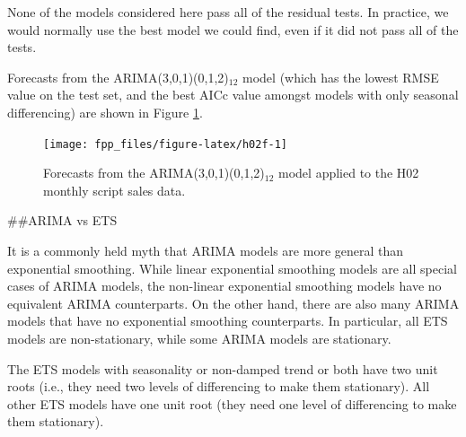 \documentclass[]{book}
\newenvironment{Shaded}{\begin{snugshade}}{\end{snugshade}}
\newcommand{\DataTypeTok}[1]{\textcolor[rgb]{0.13,0.29,0.53}{#1}}
\newcommand{\DecValTok}[1]{\textcolor[rgb]{0.00,0.00,0.81}{#1}}
\newcommand{\KeywordTok}[1]{\textcolor[rgb]{0.13,0.29,0.53}{\textbf{#1}}}
\newcommand{\NormalTok}[1]{#1}
\newcommand{\OperatorTok}[1]{\textcolor[rgb]{0.81,0.36,0.00}{\textbf{#1}}}
\newcommand{\StringTok}[1]{\textcolor[rgb]{0.31,0.60,0.02}{#1}}
\begin{document}
None of the models considered here pass all of the residual tests. In practice, we would normally use the best model we could find, even if it did not pass all of the tests.

Forecasts from the ARIMA(3,0,1)(0,1,2)\(_{12}\) model (which has the lowest RMSE value on the test set, and the best AICc value amongst models with only seasonal differencing) are shown in Figure \ref{fig:h02f}.

\begin{Shaded}
\end{Shaded}

\begin{figure}

{\centering \texttt{[image: fpp\_files/figure-latex/h02f-1]} 

}

\caption{Forecasts from the ARIMA(3,0,1)(0,1,2)$_{12}$ model applied to the H02 monthly script sales data.}\label{fig:h02f}
\end{figure}

\#\#ARIMA vs ETS

It is a commonly held myth that ARIMA models are more general than exponential smoothing. While linear exponential smoothing models are all special cases of ARIMA models, the non-linear exponential smoothing models have no equivalent ARIMA counterparts. On the other hand, there are also many ARIMA models that have no exponential smoothing counterparts. In particular, all ETS models are non-stationary, while some ARIMA models are stationary.

The ETS models with seasonality or non-damped trend or both have two unit roots (i.e., they need two levels of differencing to make them stationary). All other ETS models have one unit root (they need one level of differencing to make them stationary).
\end{document}
